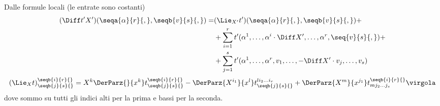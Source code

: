Dalle formule locali (le entrate sono costanti)
\begin{align*}
	(\Diff t'X') (\seqa{\alpha}{r}{,}, \seqb{v}{s}{,}) =& (\Lie_{X'}t')(\seqa{\alpha}{r}{,}, \seqb{v}{s}{,})+\\ 
	&+ \sum_{i=1}^r t'(\alpha^1,\ldots, \alpha^i\cdot\Diff X',\ldots, \alpha^r, \seq{v}{s}{,}) +\\
	&+\sum_{j=1}^s t'(\alpha^1,\ldots,\alpha^r,v_1,\ldots,-\Diff X'\cdot v_j,\ldots,v_s)
\end{align*}
\begin{equation*}
	(\Lie_Xt)_{\seqb{j}{s}{}}^{\seqb{i}{r}{}} = X^k \DerParz{}{x^k} t_{\seqb{j}{s}{}}^{\seqb{i}{r}{}} - \DerParz{X^{i_1}}{x^l} t_{\seqb{j}{s}{}}^{li_2\ldots i_r} + \DerParz{X^m}{x^{j_1}} t^{\seqb{i}{r}{}}_{mj_2\ldots j_s} \virgola
\end{equation*}
dove sommo su tutti gli indici alti per la prima e bassi per la seconda.

